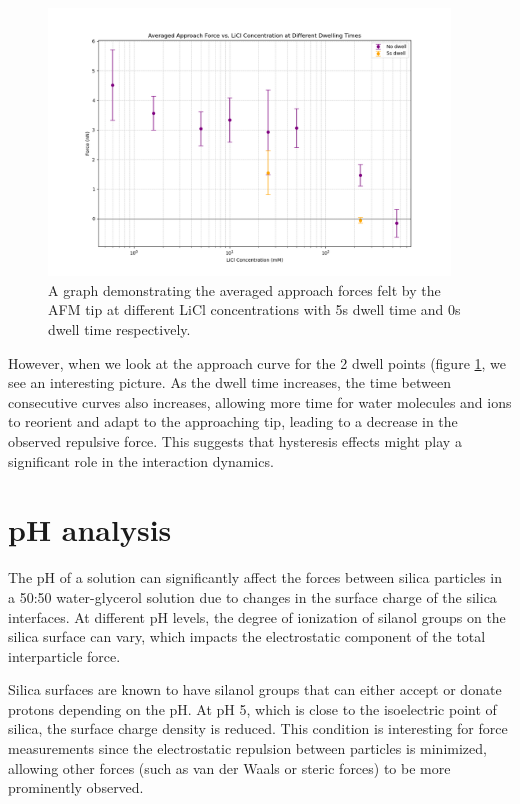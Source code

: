 \begin{figure}[h!]
\centering
\includegraphics[width=0.95\textwidth]{chapter7/Dwell/Approach overall.png}
\caption{A graph demonstrating the averaged approach forces felt by the AFM tip at different LiCl concentrations with 5s dwell time and 0s dwell time respectively.}
\label{fig:ApproachDwell}
\end{figure}

However, when we look at the approach curve for the 2 dwell points (figure \ref{fig:ApproachDwell}, we see an interesting picture. As the dwell time increases, the time between consecutive curves also increases, allowing more time for water molecules and ions to reorient and adapt to the approaching tip, leading to a decrease in the observed repulsive force. This suggests that hysteresis effects might play a significant role in the interaction dynamics.

\newpage
\section{pH analysis}

The pH of a solution can significantly affect the forces between silica particles in a 50:50 water-glycerol solution due to changes in the surface charge of the silica interfaces. At different pH levels, the degree of ionization of silanol groups on the silica surface can vary, which impacts the electrostatic component of the total interparticle force. 

Silica surfaces are known to have silanol groups that can either accept or donate protons depending on the pH. At pH 5, which is close to the isoelectric point of silica, the surface charge density is reduced. This condition is interesting for force measurements since the electrostatic repulsion between particles is minimized, allowing other forces (such as van der Waals or steric forces) to be more prominently observed. \cite{Pavan2019}

